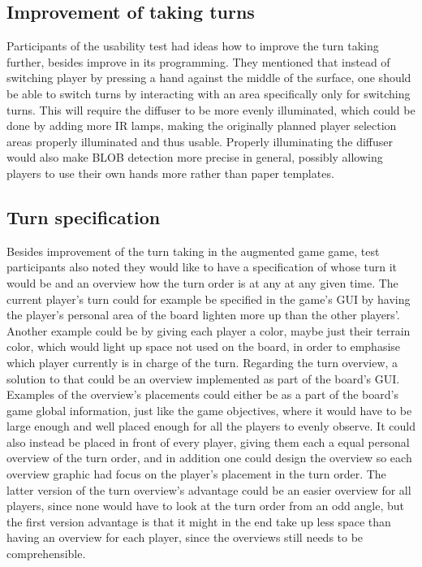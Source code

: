 \subsection{Improvement of taking turns}
Participants of the usability test had ideas how to improve the turn taking further, besides improve in its programming. They mentioned that instead of switching player by pressing a hand against the middle of the surface, one should be able to switch turns by interacting with an area specifically only for switching turns. This will require the diffuser to be more evenly illuminated, which could be done by adding more IR lamps, making the originally planned player selection areas properly illuminated and thus usable. Properly illuminating the diffuser would also make BLOB detection more precise in general, possibly allowing players to use their own hands more rather than paper templates.

\subsection{Turn specification}
Besides improvement of the turn taking in the augmented game game, test participants also noted they would like to have a specification of whose turn it would be and an overview how the turn order is at any at any given time. The current player's turn could for example be specified in the game's GUI by having the player's personal area of the board lighten more up than the other players'. Another example could be by giving each player a color, maybe just their terrain color, which would light up space not used on the board, in order to emphasise which player currently is in charge of the turn.
Regarding the turn overview, a solution to that could be an overview implemented as part of the board's GUI. Examples of the overview's placements could either be as a part of the board's game global information, just like the game objectives, where it would have to be large enough and well placed enough for all the players to evenly observe. It could also instead be placed in front of every player, giving them each a equal personal overview of the turn order, and in addition one could design the overview so each overview graphic had focus on the player's placement in the turn order. The latter version of the turn overview's advantage could be an easier overview for all players, since none would have to look at the turn order from an odd angle, but the first version advantage is that it might in the end take up less space than having an overview for each player, since the overviews still needs to be comprehensible.

